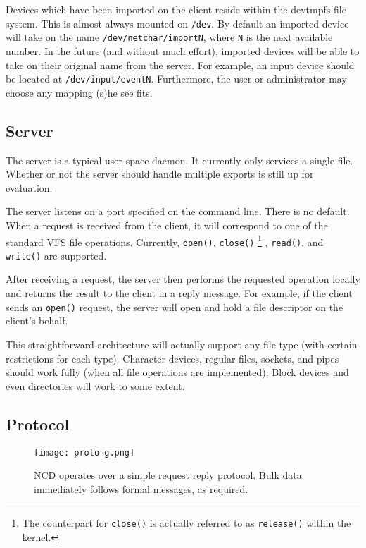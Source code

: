 \documentclass[11pt,twocolumn]{article}
\begin{document}
Devices which have been imported on the client reside within the
devtmpfs file system. This is almost always mounted on \texttt{/dev}. By
default an imported device will take on the name
\texttt{/dev/netchar/importN}, where \texttt{N} is the next available
number. In the future (and without much effort), imported devices will
be able to take on their original name from the server. For example, an
input device should be located at \texttt{/dev/input/eventN}. Furthermore,
the user or administrator may choose any mapping (s)he see fits.

\subsection{Server}

The server is a typical user-space daemon. It
currently only services a single file. Whether or not the server should
handle multiple exports is still up for evaluation.

The server listens on a port specified on the command line. There is no
default. When a request is received from the client, it will correspond
to one of the standard VFS file operations. Currently, \texttt{open()},
\texttt{close()}
\footnote{The counterpart for \texttt{close()} is actually referred to
as \texttt{release()} within the kernel.}
, \texttt{read()}, and \texttt{write()} are supported.

After receiving a request, the server then performs the requested
operation locally and returns the result to the client in a reply
message. For example, if the client sends an \texttt{open()} request,
the server will open and hold a file descriptor on the client's behalf.

This straightforward architecture will actually support any file type
(with certain restrictions for each type). Character devices, regular
files, sockets, and pipes should work fully (when all file operations
are implemented). Block devices and even directories will work to some
extent.

\subsection{Protocol}

\begin{figure}[h]
  \centering
  \texttt{[image: proto-g.png]}
  \caption{NCD operates over a simple request reply protocol. Bulk data
    immediately follows formal messages, as required.}
  \label{fig:protocol}
\end{figure}
\end{document}
